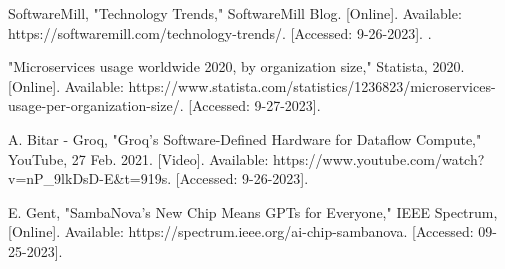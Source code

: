 \documentclass[11pt]{IEEEtran}
\begin{document}
\begin{thebibliography}{00}

 SoftwareMill, "Technology Trends," SoftwareMill Blog. [Online]. Available: https://softwaremill.com/technology-trends/. [Accessed: 9-26-2023].
.

 "Microservices usage worldwide 2020, by organization size," Statista, 2020. [Online]. Available: https://www.statista.com/statistics/1236823/microservices-usage-per-organization-size/. [Accessed: 9-27-2023].


 A. Bitar - Groq, "Groq’s Software-Defined Hardware for Dataflow Compute," YouTube, 27 Feb. 2021. [Video]. Available: https://www.youtube.com/watch?v=nP\_9lkDsD-E\&t=919s. [Accessed: 9-26-2023].

 E. Gent, "SambaNova’s New Chip Means GPTs for Everyone," IEEE Spectrum, [Online]. Available: https://spectrum.ieee.org/ai-chip-sambanova. [Accessed: 09-25-2023].

\end{thebibliography}
\end{document}
